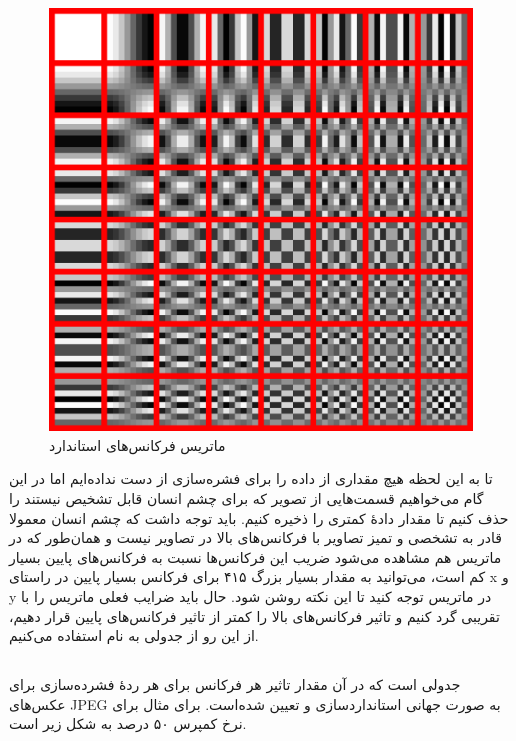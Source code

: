 \begin{figure}[]
        \centering
        \includegraphics[]{figs/freq_3.png}
        \caption{ماتریس فرکانس‌های استاندارد \cite{standard_freqs}}
        \label{freq_3}
\end{figure}

تا به این لحظه هیچ مقداری از داده را برای فشره‌سازی از دست نداده‌ایم اما 
در این گام می‌خواهیم قسمت‌هایی از تصویر که برای چشم انسان قابل تشخیص نیستند
را حذف کنیم تا مقدار دادهٔ کمتری را ذخیره کنیم. 
باید توجه داشت که چشم انسان معمولا قادر به تشخصی و تمیز تصاویر با فرکانس‌های بالا در 
تصاویر نیست و همان‌طور که در ماتریس هم مشاهده می‌شود ضریب این فرکانس‌ها نسبت 
به فرکانس‌های پایین بسیار کم است، می‌توانید به مقدار بسیار بزرگ ۴۱۵ برای
فرکانس بسیار پایین در راستای x و y در ماتریس توجه کنید تا 
این نکته روشن شود. حال باید ضرایب فعلی ماتریس را با تقریبی گرد کنیم و تاثیر 
فرکانس‌های بالا را کمتر از تاثیر فرکانس‌های پایین قرار دهیم، از این رو 
از جدولی به نام
استفاده می‌کنیم. 

\subsection{}
جدولی است که در آن مقدار تاثیر هر فرکانس برای هر ردهٔ فشرده‌سازی 
برای عکس‌های JPEG به صورت جهانی استانداردسازی و تعیین شده‌است. 
برای مثال برای نرخ کمپرس ۵۰ درصد 
به شکل زیر است. 


